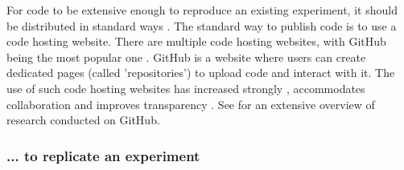 For code to be extensive enough to reproduce an existing experiment,
it should be distributed in standard ways \cite{peng2006reproducible}.
The standard way to publish code is to use a code hosting website.
There are multiple code hosting websites, 
with GitHub being the most popular one \cite{cosentino2017systematic}.
GitHub is a website where users can create dedicated pages (called 'repositories')
to upload code and interact with it.
The use of such code hosting websites
has increased strongly \cite{russell2018large},
accommodates collaboration \cite{perez2016ten}
and improves transparency \cite{gorgolewski2016practical}.
See \cite{cosentino2017systematic} for an extensive overview of
research conducted on GitHub.

\subsubsection{... to replicate an experiment}


